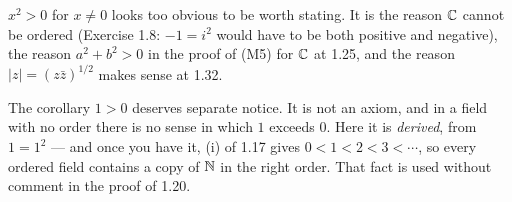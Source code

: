 \begin{pitfall}
$x^2 > 0$ for $x \ne 0$ looks too obvious to be worth stating. It is the reason
$\mathbb{C}$ cannot be ordered (Exercise 1.8: $-1 = i^2$ would have to be both positive
and negative), the reason $a^2 + b^2 > 0$ in the proof of (M5) for $\mathbb{C}$ at 1.25,
and the reason $|z| = (z\bar z)^{1/2}$ makes sense at 1.32.

The corollary $1 > 0$ deserves separate notice. It is not an axiom, and in a
field with no order there is no sense in which $1$ exceeds $0$. Here it is
\emph{derived}, from $1 = 1^2$ --- and once you have it, (i) of 1.17 gives
$0 < 1 < 2 < 3 < \cdots$, so every ordered field contains a copy of $\mathbb{N}$ in the
right order. That fact is used without comment in the proof of 1.20.
\end{pitfall}
